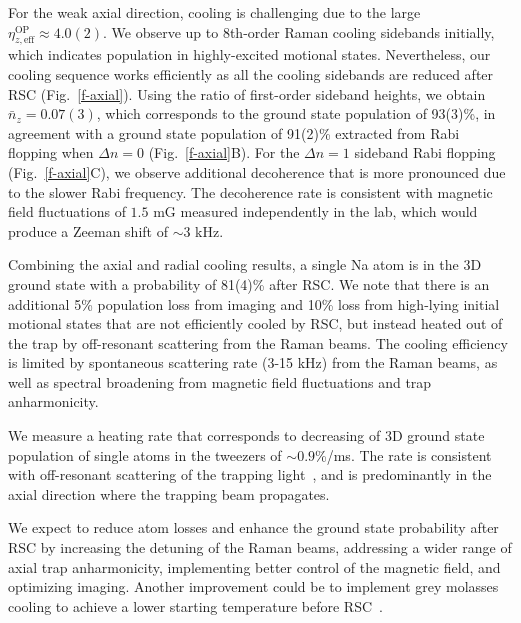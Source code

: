 \documentclass[aps,prl,twocolumn,groupedaddress]{revtex4-1}
\begin{document}
For the weak axial direction, cooling is challenging
due to the large $\eta^{\textrm{OP}}_{z,\textrm{eff}}\approx 4.0(2)$.
We observe up to 8th-order Raman cooling sidebands initially,
which indicates population in highly-excited motional states.
Nevertheless, our cooling sequence works efficiently as all the cooling sidebands are reduced
after RSC (Fig.~\ref{f-axial}).
Using the ratio of first-order sideband heights, we obtain $\bar{n}_z=0.07(3)$, which corresponds to the ground state population of
93(3)\%, in agreement with a ground state population of 91(2)\% extracted from  Rabi flopping
when $\Delta n=0$ (Fig.~\ref{f-axial}B).
For the $\Delta n=1$ sideband Rabi flopping (Fig.~\ref{f-axial}C),
we observe additional decoherence that is more pronounced due to the slower Rabi frequency.
The decoherence rate is consistent with magnetic field fluctuations of $1.5$ mG measured independently in the lab, which would produce a Zeeman shift of $\sim 3$ kHz.

Combining the axial and radial cooling results,
 a single Na atom is in  the 3D ground state  with a probability of 81(4)\% after RSC.
 We note that there is an additional 5\% population loss from  imaging  and 10\% loss
from  high-lying initial motional states that are not efficiently cooled by RSC,
but instead heated out of the trap by off-resonant scattering from the Raman beams.
The cooling efficiency is limited by spontaneous scattering rate (3-15 kHz) from the Raman beams, as well as spectral broadening from magnetic field fluctuations and trap anharmonicity.


We measure a heating rate that corresponds to  decreasing of 3D ground state population of single atoms in the tweezers  of  $\sim0.9$\%/ms.
The  rate is consistent with off-resonant scattering of the trapping light~\cite{Grimm2000}, and is predominantly in the axial direction where the trapping beam propagates.


We expect to reduce atom losses and enhance the ground state probability after RSC
by increasing the detuning of the Raman beams,
addressing a wider range of axial trap anharmonicity, %
implementing better control of the magnetic field, and optimizing imaging.
Another improvement could be to implement grey molasses cooling to achieve
a lower starting temperature before RSC~\cite{Colzi2016}.
\end{document}
